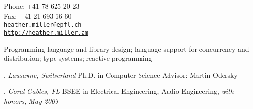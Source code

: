 \documentclass[9pt]{article}
\makeatletter
\def\myemail{heather.miller@epfl.ch}
\def\myweb{http://heather.miller.am}
\def\myfax{+41 21 693 66 60}
\def\myphone{+41 78 625 20 23}
\makeatother
\begin{document}
\begin{minipage}[t]{2.95in}

\end{minipage}
\hfill
\hfill
\begin{minipage}[t]{1.7in}
  \flushright \footnotesize Phone: \myphone \\
  Fax: \myfax  \\
  {\scriptsize  \texttt{\href{mailto:\myemail}{\myemail}}} \\
  {\scriptsize  \vspace{-0.03in} \texttt{\href{\myweb}{\myweb}}}
\end{minipage}


\medskip


\bigskip


\noindent Programming language and library design; language support for concurrency and distribution; type systems; reactive programming

\medskip


, \emph{Lausanne, Switzerland} \vspace{0.01in} 
\newline Ph.D. in Computer Science
\newline Advisor: Martin Odersky 
\medskip

, \emph{Coral Gables, FL} \vspace{0.01in}  
\newline\noindent BSEE in Electrical Engineering, Audio Engineering, {\em with honors, May 2009}
\medskip
\end{document}
